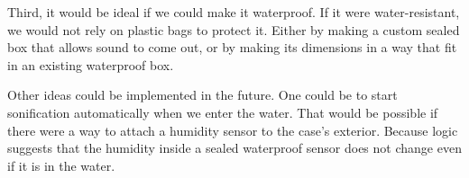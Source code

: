 Third, it would be ideal if we could make it waterproof. If it were water-resistant, we would not rely on plastic bags to protect it. Either by making a custom sealed box that allows sound to come out, or by making its dimensions in a way that fit in an existing waterproof box.

Other ideas could be implemented in the future. One could be to start sonification automatically when we enter the water. That would be possible if there were a way to attach a humidity sensor to the case's exterior. Because logic suggests that the humidity inside a sealed waterproof sensor does not change even if it is in the water.